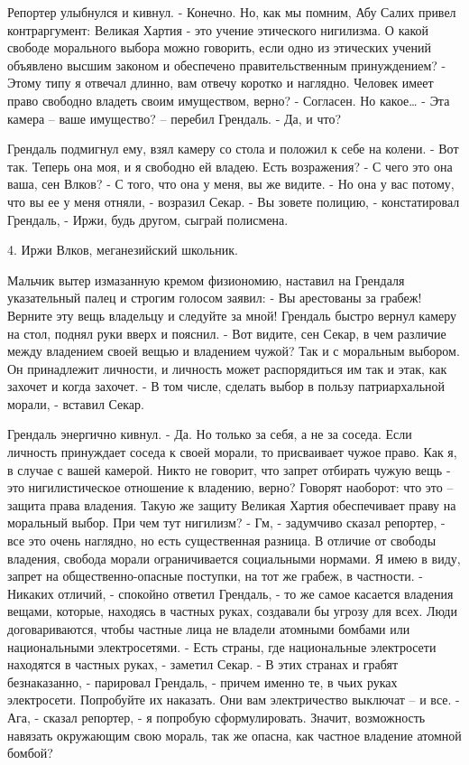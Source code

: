 Репортер улыбнулся и кивнул.
- Конечно. Но, как мы помним, Абу Салих привел контраргумент: Великая Хартия - это учение этического нигилизма. О какой свободе морального выбора можно говорить, если одно из этических учений объявлено высшим законом и обеспечено правительственным принуждением?
- Этому типу я отвечал длинно, вам отвечу коротко и наглядно. Человек имеет право свободно владеть своим имуществом, верно?
- Согласен. Но какое…
- Эта камера – ваше имущество? – перебил Грендаль.
- Да, и что?

Грендаль подмигнул ему, взял камеру со стола и положил к себе на колени.
- Вот так. Теперь она моя, и я свободно ей владею. Есть возражения?
- С чего это она ваша, сен Влков?
- С того, что она у меня, вы же видите.
- Но она у вас потому, что вы ее у меня отняли, - возразил Секар.
- Вы зовете полицию, - констатировал Грендаль, - Иржи, будь другом, сыграй полисмена.


4. Иржи Влков, меганезийский школьник.


Мальчик вытер измазанную кремом физиономию, наставил на Грендаля указательный палец и строгим голосом заявил:
- Вы арестованы за грабеж! Верните эту вещь владельцу и следуйте за мной!
Грендаль быстро вернул камеру на стол, поднял руки вверх и пояснил.
- Вот видите, сен Секар, в чем различие между владением своей вещью и владением чужой? Так и с моральным выбором. Он принадлежит личности, и личность может распорядиться им так и этак, как захочет и когда захочет.
- В том числе, сделать выбор в пользу патриархальной морали, - вставил Секар.

Грендаль энергично кивнул.
- Да. Но только за себя, а не за соседа. Если личность принуждает соседа к своей морали, то присваивает чужое право. Как я, в случае с вашей камерой. Никто не говорит, что запрет отбирать чужую вещь - это нигилистическое отношение к владению, верно? Говорят наоборот: что это – защита права владения. Такую же защиту Великая Хартия обеспечивает праву на моральный выбор. При чем тут нигилизм?
- Гм, - задумчиво сказал репортер, - все это очень наглядно, но есть существенная разница. В отличие от свободы владения, свобода морали ограничивается социальными нормами. Я имею в виду, запрет на общественно-опасные поступки, на тот же грабеж, в частности.
- Никаких отличий, - спокойно ответил Грендаль, - то же самое касается владения вещами, которые, находясь в частных руках, создавали бы угрозу для всех. Люди договариваются, чтобы частные лица не владели атомными бомбами или национальными электросетями.
- Есть страны, где национальные электросети находятся в частных руках, - заметил Секар.
- В этих странах и грабят безнаказанно, - парировал Грендаль, - причем именно те, в чьих руках электросети. Попробуйте их наказать. Они вам электричество выключат – и все.
- Ага, - сказал репортер, - я попробую сформулировать. Значит, возможность навязать окружающим свою мораль, так же опасна, как частное владение атомной бомбой?

